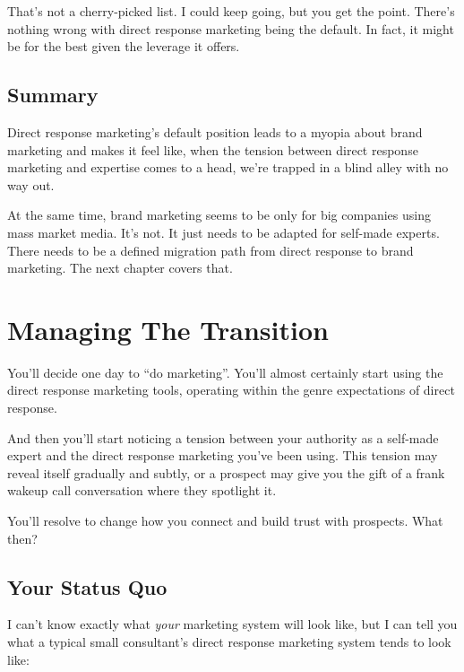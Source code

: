 \documentclass[13pt,]{tufte-handout}
\begin{document}
That's not a cherry-picked list. I could keep going, but you get the
point. There's nothing wrong with direct response marketing being the
default. In fact, it might be for the best given the leverage it offers.

\hypertarget{summary-3}{%
\subsection{Summary}\label{summary-3}}

Direct response marketing's default position leads to a myopia about
brand marketing and makes it feel like, when the tension between direct
response marketing and expertise comes to a head, we're trapped in a
blind alley with no way out.

At the same time, brand marketing seems to be only for big companies
using mass market media. It's not. It just needs to be adapted for
self-made experts. There needs to be a defined migration path from
direct response to brand marketing. The next chapter covers that.

\hypertarget{managing-the-transition}{%
\section{Managing The Transition}\label{managing-the-transition}}

You'll decide one day to ``do marketing''. You'll almost certainly start
using the direct response marketing tools, operating within the genre
expectations of direct response.

And then you'll start noticing a tension between your authority as a
self-made expert and the direct response marketing you've been using.
This tension may reveal itself gradually and subtly, or a prospect may
give you the gift of a frank wakeup call conversation where they
spotlight it.

You'll resolve to change how you connect and build trust with prospects.
What then?

\hypertarget{your-status-quo}{%
\subsection{Your Status Quo}\label{your-status-quo}}

I can't know exactly what \emph{your} marketing system will look like,
but I can tell you what a typical small consultant's direct response
marketing system tends to look like:
\end{document}
